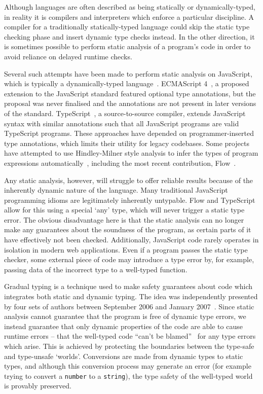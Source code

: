 \documentclass[12pt,a4paper,twoside,openright]{report}
\begin{document}
Although languages are often described as being statically or
dynamically-typed, in reality it is compilers and interpreters which enforce a
particular discipline. A compiler for a traditionally statically-typed language
could skip the static type checking phase and insert dynamic type checks
instead. In the other direction, it is sometimes possible to perform static
analysis of a program's code in order to avoid reliance on delayed runtime
checks.

Several such attempts have been made to perform static analysis on JavaScript,
which is typically a dynamically-typed language~\cite{jscript}. ECMAScript
4~\cite{es4}, a proposed extension to the JavaScript standard featured
optional type annotations, but the proposal was never finalised and the
annotations are not present in later versions of the standard.
TypeScript~\cite{ts}, a source-to-source compiler, extends JavaScript syntax
with similar annotations such that all JavaScript programs are valid TypeScript
programs. These approaches have depended on programmer-inserted type
annotations, which limits their utility for legacy codebases. Some projects
have attempted to use Hindley-Milner style analysis to infer the types of
program expressions automatically~\cite{anderson06, tajs}, including the most
recent contribution, Flow~\cite{flow}. 

Any static analysis, however, will struggle to offer reliable results because
of the inherently dynamic nature of the language. Many traditional JavaScript
programming idioms are legitimately inherently untypable. Flow and TypeScript
allow for this using a special `any' type, which will never trigger a static
type error. The obvious disadvantage here is that the static analysis can no
longer make any guarantees about the soundness of the program, as certain parts
of it have effectively not been checked.
% 
%
%
%
%
Additionally, JavaScript code rarely operates in isolation in modern web
applications. Even if a program passes the static type checker, some external
piece of code may introduce a type error by, for example, passing data of the
incorrect type to a well-typed function.

Gradual typing is a technique used to make safety guarantees about code which
integrates both static and dynamic typing. The idea was independently presented
by four sets of authors between September 2006 and January 2007~\cite{gradSiek,
gradTobin, gradMatthews, gradGronski}. Since static analysis cannot guarantee
that the program is free of dynamic type errors, we instead guarantee that only
dynamic properties of the code are able to cause runtime errors -- that the
well-typed code ``can't be blamed''~\cite{cantblame} for any type errors which
arise. This is achieved by protecting the boundaries between the type-safe and
type-unsafe `worlds'. Conversions are made from dynamic types to static types,
and although this conversion process may generate an error (for example trying
to convert a \texttt{number} to a \texttt{string}), the type safety of the
well-typed world is provably preserved.
\end{document}

